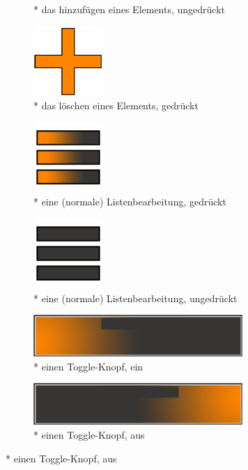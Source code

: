 \documentclass[FIPLY_base.tex]{subfiles}
\begin{document}
\begin{figure}[H]
\begin{subfigure}[b]{0.2\textwidth}
			\caption{* das hinzufügen eines Elements, ungedrückt}
		\end{subfigure}
		\hfil
		\begin{subfigure}[b]{0.2\textwidth}
			\includegraphics[scale=0.4]{img/icons/plusorangesmall}
			\caption{* das löschen eines Elements, gedrückt}
		\end{subfigure}
		\hfil
		\begin{subfigure}[b]{0.2\textwidth}
			\includegraphics[scale=0.4]{img/icons/simplelistviewpressed}
			\caption{* eine (normale) Listenbearbeitung, gedrückt}
		\end{subfigure}
		\hfil
		\begin{subfigure}[b]{0.2\textwidth}
			\includegraphics[scale=0.4]{img/icons/simplelistviewunpressed}
			\caption{* eine (normale) Listenbearbeitung, ungedrückt}
		\end{subfigure}
		\hfil
		\begin{subfigure}[b]{0.2\textwidth}
			\includegraphics[scale=0.7]{img/icons/toggleoffsmall}
			\caption{* einen Toggle-Knopf, ein}
		\end{subfigure}
		\hfil
		\begin{subfigure}[b]{0.2\textwidth}
			\includegraphics[scale=0.7]{img/icons/toggleonsmall}
			\caption{* einen Toggle-Knopf, aus}
		\end{subfigure}
		\hfil

	\end{figure}
	
	
\end{document}
